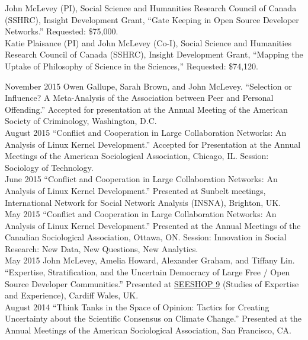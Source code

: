 \documentclass[9pt,usenames,dvipsnames]{article}
\begin{document}
\ind John McLevey (PI), Social Science and Humanities Research Council of Canada (SSHRC), Insight Development Grant, ``Gate Keeping in Open Source Developer Networks.'' Requested: \$75,000. \\

\ind Katie Plaisance (PI) and John McLevey (Co-I), Social Science and Humanities Research Council of Canada (SSHRC), Insight Development Grant, ``Mapping the Uptake of Philosophy of Science in the Sciences,'' Requested: \$74,120. \\



\ind November 2015 Owen Gallupe, Sarah Brown, and John McLevey. ``Selection or Influence? A Meta-Analysis of the Association between Peer and Personal Offending.'' Accepted for presentation at the Annual Meeting of the American Society of Criminology, Washington, D.C.\\

\ind August 2015 ``Conflict and Cooperation in Large Collaboration Networks: An Analysis of Linux Kernel Development.'' Accepted for Presentation at the Annual Meetings of the American Sociological Association, Chicago, IL. Session: Sociology of Technology. \\

\ind June 2015 ``Conflict and Cooperation in Large Collaboration Networks: An Analysis of Linux Kernel Development.'' Presented at Sunbelt meetings, International Network for Social Network Analysis (INSNA), Brighton, UK. \\

\ind May 2015 ``Conflict and Cooperation in Large Collaboration Networks: An Analysis of Linux Kernel Development.'' Presented at the Annual Meetings of the Canadian Sociological Association, Ottawa, ON. Session: Innovation in Social Research: New Data, New Questions, New Analytics.\\

\ind May 2015 John McLevey, Amelia Howard, Alexander Graham, and Tiffany Lin. ``Expertise, Stratification, and the Uncertain Democracy of Large Free / Open Source Developer Communities.'' Presented at \href{http://www.cf.ac.uk/socsi/contactsandpeople/harrycollins/expertise-project/seeshophome.html}{SEESHOP 9} (Studies of Expertise and Experience), Cardiff Wales, UK. \\

\ind August 2014 ``Think Tanks in the Space of Opinion: Tactics for Creating Uncertainty about the Scientific Consensus on Climate Change.'' Presented at the Annual Meetings of the American Sociological Association, San Francisco, CA. \\
\end{document}
